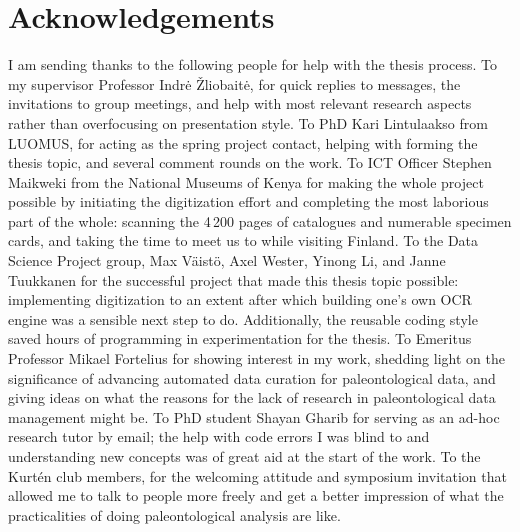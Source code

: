 \documentclass[english,twoside,openright]{UH_DS_MSc}
\begin{document}
\chapter{Acknowledgements}

I am sending thanks to the following people for help with the thesis process.
To my supervisor Professor Indr{\.e} \v{Z}liobait{\.e}, for quick replies to messages, the invitations to group meetings, and help with most relevant research aspects rather than overfocusing on presentation style.
To PhD Kari Lintulaakso from LUOMUS, for acting as the spring project contact, helping with forming the thesis topic, and several comment rounds on the work.
To ICT Officer Stephen Maikweki from the National Museums of Kenya for making the whole project possible by initiating the digitization effort and completing the most laborious part of the whole: scanning the 4\,200 pages of catalogues and numerable specimen cards, and taking the time to meet us to while visiting Finland.
To the Data Science Project group, Max V\"{a}ist\"{o}, Axel Wester, Yinong Li, and Janne Tuukkanen for the successful project that made this thesis topic possible: implementing digitization to an extent after which building one's own OCR engine was a sensible next step to do. Additionally, the reusable coding style saved hours of programming in experimentation for the thesis.
To Emeritus Professor Mikael Fortelius for showing interest in my work, shedding light on the significance of advancing automated data curation for paleontological data, and giving ideas on what the reasons for the lack of research in paleontological data management might be.
To PhD student Shayan Gharib for serving as an ad-hoc research tutor by email; the help with code errors I was blind to and understanding new concepts was of great aid at the start of the work.
To the Kurt\'{e}n club members, for the welcoming attitude and symposium invitation that allowed me to talk to people more freely and get a better impression of what the practicalities of doing paleontological analysis are like.

\cleardoublepage
{}



\end{document}

